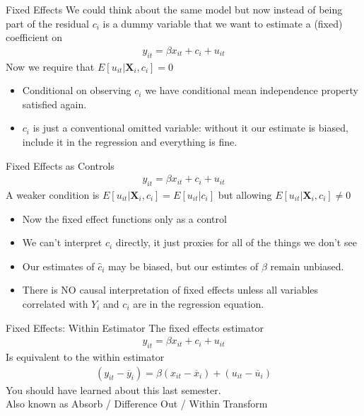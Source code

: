 \documentclass[aspectratio=169]{beamer}
\begin{document}
\begin{frame}{Fixed Effects}
We could think about the same model but now instead of being part of the \alert{residual} $c_i$ is a dummy variable that we want to estimate a (fixed) coefficient on
\begin{align*}
y_{it} = \beta x_{it} + c_i + u_{it}
\end{align*}
Now we require that $E[u_{it}| \mathbf{X}_i , c_i] = 0$
\begin{itemize}
    \item Conditional on observing $c_i$ we have conditional mean independence property satisfied again.
    \item $c_i$ is just a conventional omitted variable: without it our estimate is \alert{biased}, include it in the regression and everything is fine.
\end{itemize}
\end{frame}


\begin{frame}{Fixed Effects as Controls}
\begin{align*}
y_{it} = \beta x_{it} + c_i + u_{it}
\end{align*}
A weaker condition is $E[u_{it}| \mathbf{X}_i , c_i] = E[u_{it}| c_i]$ but allowing $E[u_{it}| \mathbf{X}_i , c_i]\neq 0$
\begin{itemize}
\item Now the fixed effect functions only as a \alert{control}
\item We can't interpret $c_i$ directly, it just proxies for all of the things we don't see
\item Our estimates of $\hat{c}_i$ may be biased, but our estimtes of $\beta$ remain \alert{unbiased}.
\item There is \alert{NO} causal interpretation of fixed effects unless \alert{all variables} correlated with $Y_i$ and $c_i$ are in the regression equation.
\end{itemize}
\end{frame}

\begin{frame}{Fixed Effects: Within Estimator}
The fixed effects estimator
\begin{align*}
y_{it} = \beta x_{it} + c_i + u_{it}
\end{align*}
Is equivalent to the \alert{within estimator} 
\begin{align*}
(y_{it} - \overline{y}_i) = \beta (x_{it} - \overline{x}_i) + (u_{it} - \overline{u}_i)
\end{align*}
You should have learned about this last semester.\\
Also known as \alert{Absorb} / \alert{ Difference Out} / \alert{ Within Transform}
\end{frame}
\end{document}
